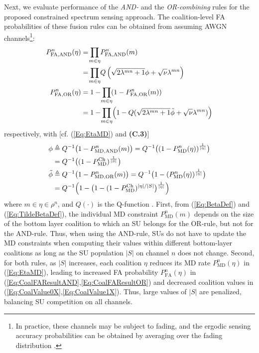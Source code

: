 \documentclass[journal,draftclsnofoot,onecolumn]{IEEEtran}
\theoremstyle{definition}
\begin{document}
Next, we evaluate performance of the \emph{AND-} and the \emph{OR-combining} rules for the proposed constrained spectrum sensing approach. The coalition-level FA probabilities of these fusion rules can be obtained from \cite[eq.~(10--17)]{YCLiangWCNC} assuming AWGN channels\footnote{In practice, these channels may be subject to fading, and the ergodic sensing accuracy probabilities can be obtained by averaging over the fading distribution \cite{CoopSense,MultiChCoalSenseGame,ZHanCoalSenseGame}.}:
\begin{align}
P_\mathrm{FA,AND}^n(\eta ) &=\smashoperator{\prod\limits_{m \in \eta }}P_\mathrm{FA,AND}^n(m)\label{Eq:CoalFAResultAND}\\
&= \smashoperator{\prod\limits_{m \in \eta }}Q\left(\sqrt{2\lambda^{mn}+1}\phi+\sqrt\nu\lambda^{mn}\right)\notag\\
P_\mathrm{FA,OR}^n(\eta ) &=1 - \smashoperator{\prod\limits_{m \in \eta }}(1-P_\mathrm{FA,OR}^n(m))\label{Eq:CoalFAResultOR}\\
&= 1 - \smashoperator{\prod\limits_{m \in \eta }}{\left(1-Q(\sqrt{2\lambda^{mn}+1}\tilde{\phi}+\sqrt\nu\lambda^{mn})\right)}\notag
\end{align}
respectively, with [cf. (\ref{Eq:EtaMD}) and \textbf{(C.3)}]
\begin{align}
\phi  &\triangleq Q^{-1}\big(1-P_\mathrm{MD,AND}^n(m)\big)=Q^{-1}\big( {( 1 - P_\mathrm{MD}^n(\eta ) )}^\frac{1}{|\eta |} \big)\notag\\
&=Q^{-1}\big((1-P_\mathrm{MD}^\mathrm{Ch})^\frac{1}{|S |}\big)\label{Eq:BetaDef}\\
\tilde \phi & \triangleq Q^{-1}\big(1-P_\mathrm{MD,OR}^n(m)\big)= Q^{- 1}\big( 1 - ( {P_{\mathrm{MD}}^n(\eta )} )^\frac{1}{|\eta|}\big)\notag\\
&= Q^{- 1}\Big( 1 - \big( 1-(1-P_\mathrm{MD}^\mathrm{Ch})^{|\eta|/{|S|}} \big)^\frac{1}{|\eta|}\Big)\label{Eq:TildeBetaDef}
\end{align}
where $m\in \eta\in \rho^n$, and $Q(\cdot)$ is the Q-function \cite[eq. (B.20)]{GoldsmithWireless}. First, from (\ref{Eq:BetaDef}) and (\ref{Eq:TildeBetaDef}), the individual MD constraint $P_\mathrm{MD}^n(m)$ depends on the size of the bottom layer coalition to which an SU belongs for the OR-rule, but not for the AND-rule. Thus, when using the AND-rule, SUs do not have to update the MD constraints when computing their values within different bottom-layer coalitions as long as the SU population $|S|$ on channel $n$ does not change. Second, for both rules, as $|S|$ increases, each coalition $\eta$ reduces its MD rate $P_\mathrm{MD}^n(\eta)$ in (\ref{Eq:EtaMD}), leading to increased FA probability $P^n_\mathrm{FA}(\eta)$ in (\ref{Eq:CoalFAResultAND},\ref{Eq:CoalFAResultOR}) and decreased coalition values in (\ref{Eq:CoalValue0X},\ref{Eq:CoalValue1X}). Thus, large values of $|S|$ are penalized, balancing SU competition on all channels. 
\end{document}
